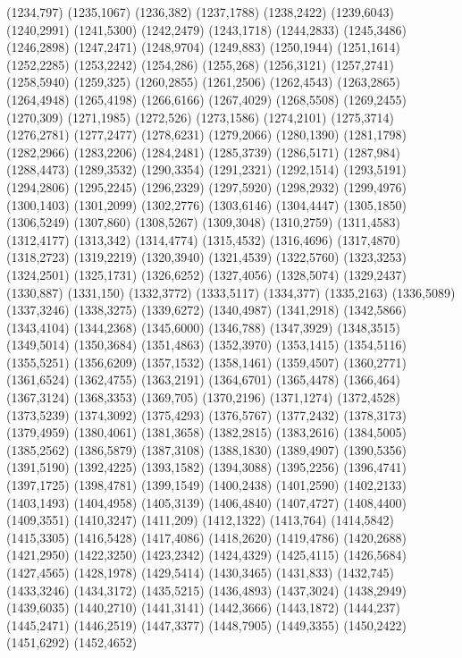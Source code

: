 (1234,797)
(1235,1067)
(1236,382)
(1237,1788)
(1238,2422)
(1239,6043)
(1240,2991)
(1241,5300)
(1242,2479)
(1243,1718)
(1244,2833)
(1245,3486)
(1246,2898)
(1247,2471)
(1248,9704)
(1249,883)
(1250,1944)
(1251,1614)
(1252,2285)
(1253,2242)
(1254,286)
(1255,268)
(1256,3121)
(1257,2741)
(1258,5940)
(1259,325)
(1260,2855)
(1261,2506)
(1262,4543)
(1263,2865)
(1264,4948)
(1265,4198)
(1266,6166)
(1267,4029)
(1268,5508)
(1269,2455)
(1270,309)
(1271,1985)
(1272,526)
(1273,1586)
(1274,2101)
(1275,3714)
(1276,2781)
(1277,2477)
(1278,6231)
(1279,2066)
(1280,1390)
(1281,1798)
(1282,2966)
(1283,2206)
(1284,2481)
(1285,3739)
(1286,5171)
(1287,984)
(1288,4473)
(1289,3532)
(1290,3354)
(1291,2321)
(1292,1514)
(1293,5191)
(1294,2806)
(1295,2245)
(1296,2329)
(1297,5920)
(1298,2932)
(1299,4976)
(1300,1403)
(1301,2099)
(1302,2776)
(1303,6146)
(1304,4447)
(1305,1850)
(1306,5249)
(1307,860)
(1308,5267)
(1309,3048)
(1310,2759)
(1311,4583)
(1312,4177)
(1313,342)
(1314,4774)
(1315,4532)
(1316,4696)
(1317,4870)
(1318,2723)
(1319,2219)
(1320,3940)
(1321,4539)
(1322,5760)
(1323,3253)
(1324,2501)
(1325,1731)
(1326,6252)
(1327,4056)
(1328,5074)
(1329,2437)
(1330,887)
(1331,150)
(1332,3772)
(1333,5117)
(1334,377)
(1335,2163)
(1336,5089)
(1337,3246)
(1338,3275)
(1339,6272)
(1340,4987)
(1341,2918)
(1342,5866)
(1343,4104)
(1344,2368)
(1345,6000)
(1346,788)
(1347,3929)
(1348,3515)
(1349,5014)
(1350,3684)
(1351,4863)
(1352,3970)
(1353,1415)
(1354,5116)
(1355,5251)
(1356,6209)
(1357,1532)
(1358,1461)
(1359,4507)
(1360,2771)
(1361,6524)
(1362,4755)
(1363,2191)
(1364,6701)
(1365,4478)
(1366,464)
(1367,3124)
(1368,3353)
(1369,705)
(1370,2196)
(1371,1274)
(1372,4528)
(1373,5239)
(1374,3092)
(1375,4293)
(1376,5767)
(1377,2432)
(1378,3173)
(1379,4959)
(1380,4061)
(1381,3658)
(1382,2815)
(1383,2616)
(1384,5005)
(1385,2562)
(1386,5879)
(1387,3108)
(1388,1830)
(1389,4907)
(1390,5356)
(1391,5190)
(1392,4225)
(1393,1582)
(1394,3088)
(1395,2256)
(1396,4741)
(1397,1725)
(1398,4781)
(1399,1549)
(1400,2438)
(1401,2590)
(1402,2133)
(1403,1493)
(1404,4958)
(1405,3139)
(1406,4840)
(1407,4727)
(1408,4400)
(1409,3551)
(1410,3247)
(1411,209)
(1412,1322)
(1413,764)
(1414,5842)
(1415,3305)
(1416,5428)
(1417,4086)
(1418,2620)
(1419,4786)
(1420,2688)
(1421,2950)
(1422,3250)
(1423,2342)
(1424,4329)
(1425,4115)
(1426,5684)
(1427,4565)
(1428,1978)
(1429,5414)
(1430,3465)
(1431,833)
(1432,745)
(1433,3246)
(1434,3172)
(1435,5215)
(1436,4893)
(1437,3024)
(1438,2949)
(1439,6035)
(1440,2710)
(1441,3141)
(1442,3666)
(1443,1872)
(1444,237)
(1445,2471)
(1446,2519)
(1447,3377)
(1448,7905)
(1449,3355)
(1450,2422)
(1451,6292)
(1452,4652)
